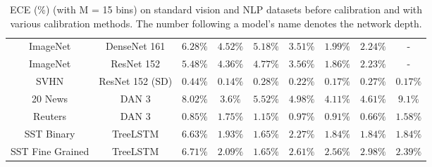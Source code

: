 \begin{table}
{\begin{tabular}{ *{9}{c} }
      ImageNet & DenseNet 161 & $6.28\%$ & $4.52\%$ & $5.18\%$ & $3.51\%$ & $1.99\%$ & $2.24\%$ & - \\
      ImageNet & ResNet 152 & $5.48\%$ & $4.36\%$ & $4.77\%$ & $3.56\%$ & $1.86\%$ & $2.23\%$ & - \\
      SVHN & ResNet 152 (SD) & $0.44\%$ & $0.14\%$ & $0.28\%$ & $0.22\%$ & $0.17\%$ & $0.27\%$ & $0.17\%$ \\
      \hline
	  20 News & DAN 3 & $8.02\%$ & $3.6\%$ & $5.52\%$ & $4.98\%$ & $4.11\%$ & $4.61\%$ & $9.1\%$ \\
      Reuters & DAN 3 & $0.85\%$ & $1.75\%$ & $1.15\%$ & $0.97\%$ & $0.91\%$ & $0.66\%$ & $1.58\%$ \\
      SST Binary & TreeLSTM & $6.63\%$ & $1.93\%$ & $1.65\%$ & $2.27\%$ & $1.84\%$ & $1.84\%$ & $1.84\%$ \\
      SST Fine Grained & TreeLSTM & $6.71\%$ & $2.09\%$ & $1.65\%$ & $2.61\%$ & $2.56\%$ & $2.98\%$ & $2.39\%$ \\
      \hline
    \end{tabular}
  }
  \caption{
    ECE (\%) (with M = 15 bins) on standard vision and NLP datasets before calibration and with various calibration methods. The number following a model’s name denotes the network depth.
  }
  \label{comparison_calibration_methods}
\end{table}

